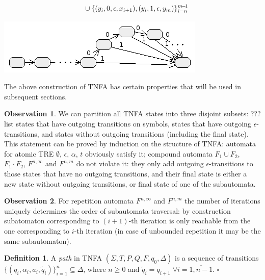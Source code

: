 \documentclass{article}
\newcommand{\Xeq}{\!=\!}
\theoremstyle{definition}
\newtheorem{Xdef}{Definition}
\newtheorem{Xobs}{Observation}
\begin{document}
\begin{multicols}{2}
\begin{align*}
                & \hphantom{\hspace{2em}}
                    \cup \{(y_i, 0, \epsilon, x_{i+1}), (y_i, 1, \epsilon, y_m)\}_{i=n}^{m\!-\!1}
    \end{align*}
%
\begin{center}
\includegraphics[width=0.9\linewidth]{img/tnfa/repeat_bound.png}
\end{center}

The above construction of TNFA has certain properties that will be used in subsequent sections.

\begin{Xobs}\label{obs_tnfa_states}
We can partition all TNFA states into three disjoint subsets: ???list
states that have outgoing transitions on symbols,
states that have outgoing $\epsilon$-transitions,
and states without outgoing transitions (including the final state).
This statement can be proved by induction on the structure of TNFA:
automata for atomic TRE $\emptyset$, $\epsilon$, $\alpha$, $t$ obviously satisfy it;
compound automata $F_1 \cup F_2$, $F_1 \cdot F_2$, $F^{n,\infty}$ and $F^{n,m}$
do not violate it:
they only add outgoing $\epsilon$-transitions to those states that have no outgoing transitions,
and their final state is either a new state without outgoing transitions,
or final state of one of the subautomata.
\end{Xobs}

\begin{Xobs}\label{obs_tnfa_repeat}
For repetition automata $F^{n,\infty}$ and $F^{n,m}$
the number of iterations uniquely determines the order of subautomata traversal:
by construction subatomaton corresponding to $(i \!+\! 1)$-th iteration is only reachable
from the one corresponding to $i$-th iteration
(in case of unbounded repetition it may be the same subautomaton).
\end{Xobs}

    \begin{Xdef}
    A \emph{path} in TNFA $(\Sigma, T, P, Q, F, q_0, \Delta)$ is a sequence of transitions
    $\{(q_i, \alpha_i, a_i, \widetilde{q}_i)\}_{i=1}^n \subseteq \Delta$, where $n \!\geq\! 0$
    and $\widetilde{q}_i \Xeq q_{i+1} \; \forall i \Xeq \overline{1,n-1}$.
    $\square$
    \end{Xdef}


\end{multicols}
\end{document}
